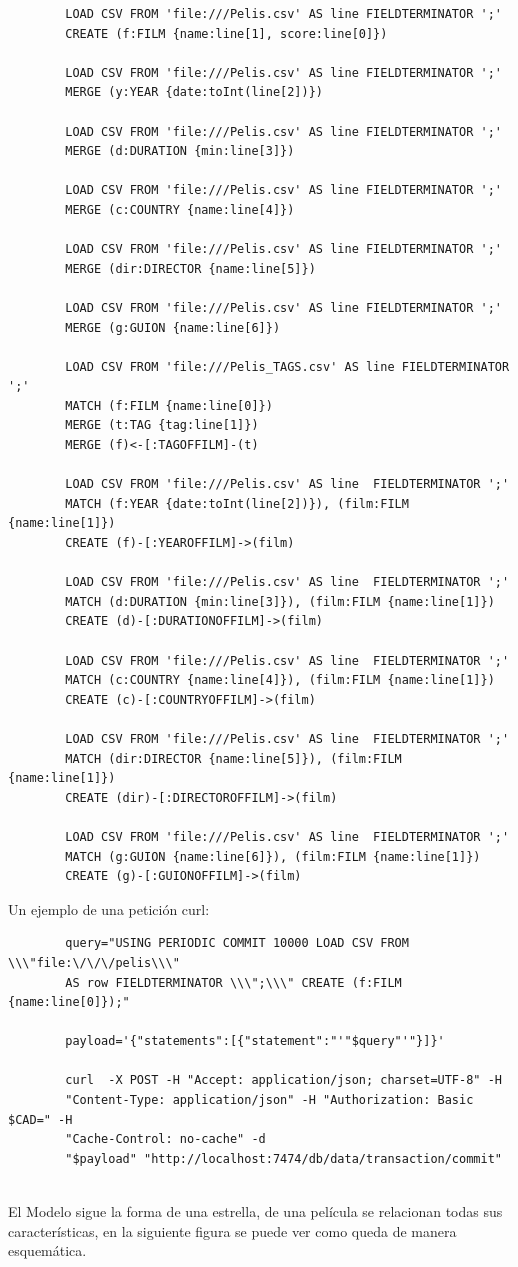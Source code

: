 \documentclass[12pt,a4paper]{article}
\begin{document}
		\begin{verbatim}
		LOAD CSV FROM 'file:///Pelis.csv' AS line FIELDTERMINATOR ';' 
		CREATE (f:FILM {name:line[1], score:line[0]})
		
		LOAD CSV FROM 'file:///Pelis.csv' AS line FIELDTERMINATOR ';' 
		MERGE (y:YEAR {date:toInt(line[2])})
		
		LOAD CSV FROM 'file:///Pelis.csv' AS line FIELDTERMINATOR ';' 
		MERGE (d:DURATION {min:line[3]})
		
		LOAD CSV FROM 'file:///Pelis.csv' AS line FIELDTERMINATOR ';' 
		MERGE (c:COUNTRY {name:line[4]})
		
		LOAD CSV FROM 'file:///Pelis.csv' AS line FIELDTERMINATOR ';' 
		MERGE (dir:DIRECTOR {name:line[5]})
		
		LOAD CSV FROM 'file:///Pelis.csv' AS line FIELDTERMINATOR ';' 
		MERGE (g:GUION {name:line[6]})
		
		LOAD CSV FROM 'file:///Pelis_TAGS.csv' AS line FIELDTERMINATOR ';' 
		MATCH (f:FILM {name:line[0]})
		MERGE (t:TAG {tag:line[1]})
		MERGE (f)<-[:TAGOFFILM]-(t)
		
		LOAD CSV FROM 'file:///Pelis.csv' AS line  FIELDTERMINATOR ';' 
		MATCH (f:YEAR {date:toInt(line[2])}), (film:FILM {name:line[1]})
		CREATE (f)-[:YEAROFFILM]->(film)
		
		LOAD CSV FROM 'file:///Pelis.csv' AS line  FIELDTERMINATOR ';' 
		MATCH (d:DURATION {min:line[3]}), (film:FILM {name:line[1]})
		CREATE (d)-[:DURATIONOFFILM]->(film)
		
		LOAD CSV FROM 'file:///Pelis.csv' AS line  FIELDTERMINATOR ';' 
		MATCH (c:COUNTRY {name:line[4]}), (film:FILM {name:line[1]})
		CREATE (c)-[:COUNTRYOFFILM]->(film)
		
		LOAD CSV FROM 'file:///Pelis.csv' AS line  FIELDTERMINATOR ';' 
		MATCH (dir:DIRECTOR {name:line[5]}), (film:FILM {name:line[1]})
		CREATE (dir)-[:DIRECTOROFFILM]->(film)
		
		LOAD CSV FROM 'file:///Pelis.csv' AS line  FIELDTERMINATOR ';' 
		MATCH (g:GUION {name:line[6]}), (film:FILM {name:line[1]})
		CREATE (g)-[:GUIONOFFILM]->(film)
		\end{verbatim}
		
		
		Un ejemplo de una petición curl:
		
		\begin{verbatim}
		query="USING PERIODIC COMMIT 10000 LOAD CSV FROM \\\"file:\/\/\/pelis\\\" 
		AS row FIELDTERMINATOR \\\";\\\" CREATE (f:FILM {name:line[0]});"
		
		payload='{"statements":[{"statement":"'"$query"'"}]}'
		
		curl  -X POST -H "Accept: application/json; charset=UTF-8" -H 
		"Content-Type: application/json" -H "Authorization: Basic $CAD=" -H 
		"Cache-Control: no-cache" -d 
		"$payload" "http://localhost:7474/db/data/transaction/commit"
		
		\end{verbatim}
		\clearpage
		El Modelo sigue la forma de una estrella, de una película se relacionan todas sus características, en la siguiente figura se puede ver como queda de manera esquemática.
		
\end{document}
